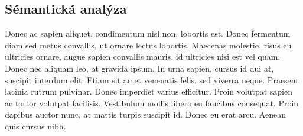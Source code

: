 \documentclass[11pt, a4paper]{article}
\begin{document}
\iffalse
\begin{comment}
Commented code

\label{sec:3}
Pokud budeme chtít vysázet algoritmus, můžeme použít prostředí \verb|algorithm|\footnote{Pro nápovědu, jak
zacházet s prostředím \texttt{algorithm}, můžeme zkusit tuhle stránku: \newline
http://ftp.cstug.cz/pub/tex/CTAN/macros/latex/contrib/algorithms/algorithms.pdf.}  nebo
\verb|algorithm2e|\footnote{Pro \texttt{algorithm2e} zase tuhle:
http://ftp.cstug.cz/pub/tex/CTAN/macros/latex/contrib/algorithm2e/algorithm2e.pdf.}. \newline
Příklad použití prostředí \verb|algorithm2e| viz Algoritmus \ref{algoritmus:1}.
\vspace{1.5em}

\begin{algorithm}[H]
  \label{algoritmus:1}
  \SetInd{0em}{1em}
  \SetNlSty{}{}{:}
  \SetNlSkip{-1em}
  \KwIn{$(X_{t-1},u_t,z_t)$}
  \KwOut{$X_t$}
  \Indp
  \Indp
  \BlankLine
  $\overline{X_t} = X_t = 0$\\
  \For{$k=1$ \emph{to} $M$}{
    \hspace{1em}$x_t^{[k]}=$ \textit{sample\_motion\_model}$(u_t,x_{t-1}^{[k]})$\\
     \hspace{1em}$\omega_t^{[k]}=$ \textit{measurement\_model}$(z_t,x_{t}^{[k]},m_{t-1})$\\
     \hspace{1em}$m_t^{[k]}=updated\_occupancy\_grid(z_t,x_{t}^{[k]},m_{t-1}^{[k]})$\\\
     \hspace{1em}$\overline{X_t}=\overline{X_t}+\langle x_x^{[m]},\omega_t^{[m]}\rangle$
  }
  \For{$k=1$ \emph{to} $M$}{
     \hspace{1em}draw $i$ with probability $\approx \omega_t^{[i]}$\\
     \hspace{1em}add $\langle x_x^{[k]},m_t^{[k]}\rangle$ to $X_t$\\
  }
  \KwRet{$X_t$}
  \caption{\textsc{Fast}SLAM}
\end{algorithm}
\vspace{1em}
\end{comment}
\fi

\subsection{Sémantická analýza}
Donec ac sapien aliquet, condimentum nisl non, lobortis est. Donec fermentum diam sed metus convallis, ut ornare lectus lobortis. Maecenas molestie, risus eu ultricies ornare, augue sapien convallis mauris, id ultricies nisi est vel quam. Donec nec aliquam leo, at gravida ipsum. In urna sapien, cursus id dui at, suscipit interdum elit. Etiam sit amet venenatis felis, sed viverra neque. Praesent lacinia rutrum pulvinar. Donec imperdiet varius efficitur. Proin volutpat sapien ac tortor volutpat facilisis. Vestibulum mollis libero eu faucibus consequat. Proin dapibus auctor nunc, at mattis turpis suscipit id. Donec eu erat arcu. Aenean quis cursus nibh. 
\end{document}
